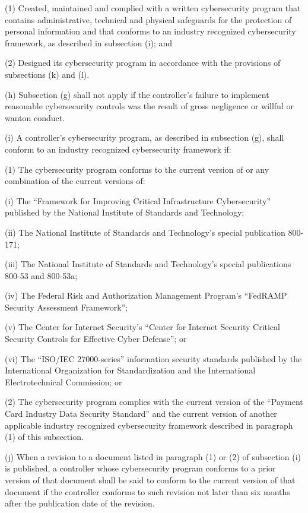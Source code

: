 (1) Created, maintained and complied with a written cybersecurity program that contains administrative, technical and physical safeguards for the protection of personal information and that conforms to an industry recognized cybersecurity framework, as described in subsection (i); and

(2) Designed its cybersecurity program in accordance with the provisions of subsections (k) and (l).

(h) Subsection (g) shall not apply if the controller’s failure to implement reasonable cybersecurity controls was the result of gross negligence or willful or wanton conduct.

(i) A controller’s cybersecurity program, as described in subsection (g), shall conform to an industry recognized cybersecurity framework if:

(1) The cybersecurity program conforms to the current version of or any combination of the current versions of:

(i) The “Framework for Improving Critical Infrastructure Cybersecurity” published by the National Institute of Standards and Technology;

(ii) The National Institute of Standards and Technology's special publication 800-171;

(iii) The National Institute of Standards and Technology's special publications 800-53 and 800-53a;

(iv) The Federal Risk and Authorization Management Program's “FedRAMP Security Assessment Framework”;

(v) The Center for Internet Security’s “Center for Internet Security Critical Security Controls for Effective Cyber Defense”; or

(vi) The “ISO/IEC 27000-series” information security standards published by the International Organization for Standardization and the International Electrotechnical Commission; or

(2) The cybersecurity program complies with the current version of the “Payment Card Industry Data Security Standard” and the current version of another applicable industry recognized cybersecurity framework described in paragraph (1) of this subsection.

(j) When a revision to a document listed in paragraph (1) or (2) of subsection (i) is published, a controller whose cybersecurity program conforms to a prior version of that document shall be said to conform to the current version of that document if the controller conforms to such revision not later than six months after the publication date of the revision.

